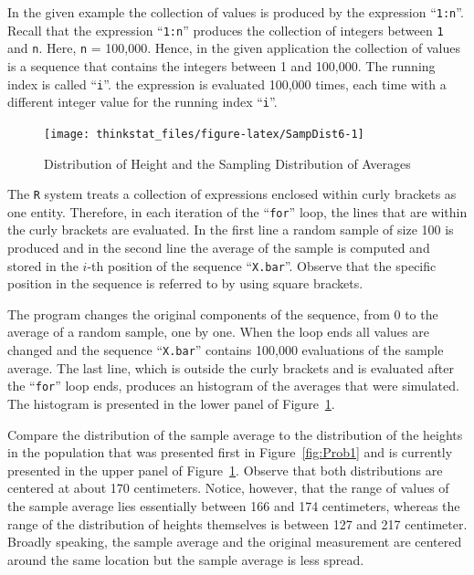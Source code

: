 \documentclass[]{krantz}
\theoremstyle{definition}
\theoremstyle{definition}
\theoremstyle{definition}
\theoremstyle{remark}
\begin{document}
In the given example the collection of values is produced by the
expression ``\texttt{1:n}''. Recall that the expression ``\texttt{1:n}''
produces the collection of integers between \texttt{1} and \texttt{n}.
Here, \texttt{n} = 100,000. Hence, in the given application the
collection of values is a sequence that contains the integers between 1
and 100,000. The running index is called ``\texttt{i}''. the expression
is evaluated 100,000 times, each time with a different integer value for
the running index ``\texttt{i}''.

\begin{figure}

{\centering \texttt{[image: thinkstat\_files/figure-latex/SampDist6-1]} 

}

\caption{Distribution of Height and the Sampling Distribution of Averages}\label{fig:SampDist6}
\end{figure}

The \texttt{R} system treats a collection of expressions enclosed within
curly brackets as one entity. Therefore, in each iteration of the
``\texttt{for}'' loop, the lines that are within the curly brackets are
evaluated. In the first line a random sample of size 100 is produced and
in the second line the average of the sample is computed and stored in
the \(i\)-th position of the sequence ``\texttt{X.bar}''. Observe that
the specific position in the sequence is referred to by using square
brackets.

The program changes the original components of the sequence, from 0 to
the average of a random sample, one by one. When the loop ends all
values are changed and the sequence ``\texttt{X.bar}'' contains 100,000
evaluations of the sample average. The last line, which is outside the
curly brackets and is evaluated after the ``\texttt{for}'' loop ends,
produces an histogram of the averages that were simulated. The histogram
is presented in the lower panel of Figure~\ref{fig:SampDist6}.

Compare the distribution of the sample average to the distribution of
the heights in the population that was presented first in
Figure~\ref{fig:Prob1} and is currently presented in the upper panel of
Figure~\ref{fig:SampDist6}. Observe that both distributions are centered
at about 170 centimeters. Notice, however, that the range of values of
the sample average lies essentially between 166 and 174 centimeters,
whereas the range of the distribution of heights themselves is between
127 and 217 centimeter. Broadly speaking, the sample average and the
original measurement are centered around the same location but the
sample average is less spread.
\end{document}

